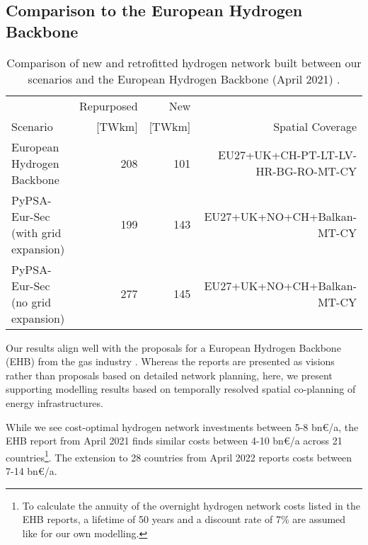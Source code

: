 \subsection*{Comparison to the European Hydrogen Backbone}

\begin{table}
  \caption{Comparison of new and retrofitted hydrogen network built between our scenarios and the European Hydrogen Backbone (April 2021) \cite{gasforclimateExtendingEuropean2021}.}
  \label{tab:ehb}
  \centering
  \footnotesize
  \begin{tabular}{lrrr}
      \toprule
       & Repurposed & New &  \\
       Scenario& [TWkm] & [TWkm] & Spatial Coverage \\
      \midrule
      European Hydrogen Backbone \cite{gasforclimateExtendingEuropean2021} & 208 & 101 & EU27+UK+CH-PT-LT-LV-HR-BG-RO-MT-CY\\
      PyPSA-Eur-Sec (with grid expansion) & 199 & 143 & EU27+UK+NO+CH+Balkan-MT-CY \\
      PyPSA-Eur-Sec (no grid expansion) & 277 & 145 & EU27+UK+NO+CH+Balkan-MT-CY \\
      \bottomrule
    \end{tabular}
\end{table}



Our results align well with the proposals for a European Hydrogen Backbone (EHB)
from the gas industry
\cite{gasforclimateEuropeanHydrogen2020,gasforclimateExtendingEuropean2021,gasforclimateEuropeanHydrogen2021,gasforclimateEuropeanHydrogen2022}.
Whereas the reports are presented as visions rather than proposals based on
detailed network planning, here, we present supporting modelling results based on
temporally resolved spatial co-planning of energy infrastructures.

While we see cost-optimal hydrogen network investments between 5-8 bn\euro/a,
the EHB report from April 2021 \cite{gasforclimateExtendingEuropean2021} finds
similar costs between 4-10 bn\euro/a across 21
countries\footnote{To calculate the annuity of the overnight hydrogen
network costs listed in the EHB reports, a lifetime of 50 years and a discount
rate of 7\% are assumed like for our own modelling.}. The extension to 28
countries from April 2022 \cite{gasforclimateEuropeanHydrogen2022} reports costs
between 7-14 bn\euro/a.

